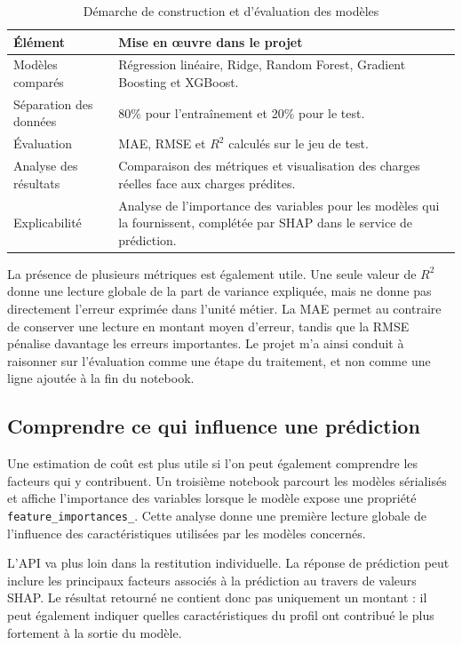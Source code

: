 \begin{table}[H]
\centering
\begin{tabular}{p{5.0cm} p{8.6cm}}
\toprule
\textbf{Élément} & \textbf{Mise en œuvre dans le projet} \\
\midrule
Modèles comparés & Régression linéaire, Ridge, Random Forest, Gradient Boosting et XGBoost. \\
Séparation des données & 80\% pour l'entraînement et 20\% pour le test. \\
Évaluation & MAE, RMSE et $R^2$ calculés sur le jeu de test. \\
Analyse des résultats & Comparaison des métriques et visualisation des charges réelles face aux charges prédites. \\
Explicabilité & Analyse de l'importance des variables pour les modèles qui la fournissent, complétée par SHAP dans le service de prédiction. \\
\bottomrule
\end{tabular}
\caption{Démarche de construction et d'évaluation des modèles}
\label{tab:insurance-modeles}
\end{table}

La présence de plusieurs métriques est également utile. Une seule valeur de $R^2$ donne une lecture globale de la part de variance expliquée, mais ne donne pas directement l'erreur exprimée dans l'unité métier. La MAE permet au contraire de conserver une lecture en montant moyen d'erreur, tandis que la RMSE pénalise davantage les erreurs importantes. Le projet m'a ainsi conduit à raisonner sur l'évaluation comme une étape du traitement, et non comme une ligne ajoutée à la fin du notebook.

\subsection{Comprendre ce qui influence une prédiction}

Une estimation de coût est plus utile si l'on peut également comprendre les facteurs qui y contribuent. Un troisième notebook parcourt les modèles sérialisés et affiche l'importance des variables lorsque le modèle expose une propriété \texttt{feature\_importances\_}. Cette analyse donne une première lecture globale de l'influence des caractéristiques utilisées par les modèles concernés.

L'API va plus loin dans la restitution individuelle. La réponse de prédiction peut inclure les principaux facteurs associés à la prédiction au travers de valeurs SHAP. Le résultat retourné ne contient donc pas uniquement un montant : il peut également indiquer quelles caractéristiques du profil ont contribué le plus fortement à la sortie du modèle.

